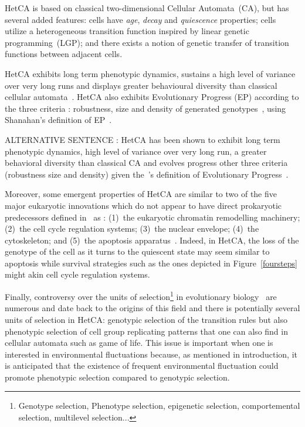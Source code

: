 HetCA is based on classical two-dimensional Cellular Automata~(CA), but has several added features: cells have \emph{age}, \emph{decay} and \emph{quiescence} properties; cells utilize a heterogeneous transition function inspired by linear genetic programming~(LGP); and there exists a notion of genetic transfer of transition functions between adjacent cells.

HetCA exhibits long term phenotypic dynamics, sustains a high level of variance over very long runs and displays greater behavioural diversity than classical cellular automata~\citep{medernach2013long}. HetCA also exhibits Evolutionary Progress (EP) according to the three criteria : robustness, size and density of generated genotypes~\citep{medernach2015evolutionary}, using Shanahan's definition of EP~\citep{shanahan2012evolutionary}.

\rightarrow ALTERNATIVE SENTENCE : HetCA has been shown to exhibit long term phenotypic dynamics, high level of variance over very long run, a greater behavioral diversity than classical CA and evolves progress other three criteria (robustness size and density) given the~\cite{shanahan2012evolutionary}'s definition of Evolutionary Progress~\citep{medernach2015evolutionary}.

Moreover, some emergent properties of HetCA are similar to two of the five major eukaryotic innovations which do not appear to have direct prokaryotic predecessors defined in~\citep{smith1997major} as : (1)~the eukaryotic chromatin remodelling machinery; (2)~the cell cycle regulation systems; (3)~the nuclear envelope; (4)~the cytoskeleton; and (5)~the apoptosis apparatus~\citep{koonin2002origin}. Indeed, in HetCA, the loss of the genotype of the cell as it turns to the quiescent state may seem similar to apoptosis while survival strategies such as the ones depicted in Figure~\ref{foursteps} might akin cell cycle regulation systems.

Finally, controversy over the units of selection\footnote{Genotype selection, Phenotype selection, epigenetic selection, comportemental selection, multilevel selection...} in evolutionary biology~\citep{okasha2006evolution} are numerous and date back to the origins of this field  and there is potentially several units of selection in HetCA: genotypic selection of the transition rules but also phenotypic selection of cell group replicating patterns that one can also find in cellular automata such as game of life.  This issue is important when one is interested in environmental fluctuations because, as mentioned in introduction, it is anticipated that the existence of frequent environmental fluctuation could promote phenotypic selection compared to genotypic selection.


